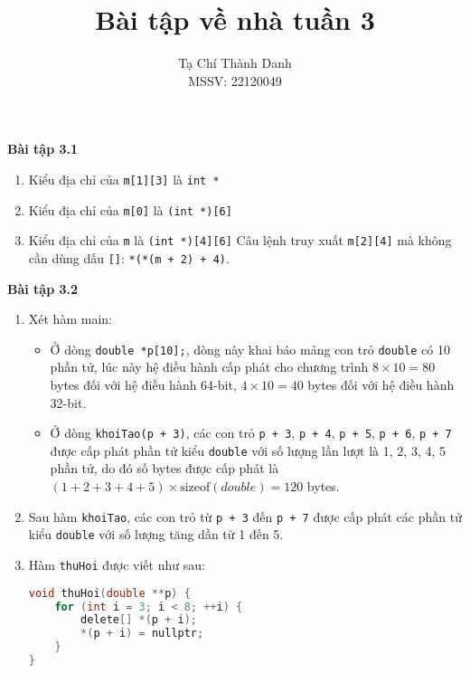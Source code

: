 \documentclass[a4paper, 12pt, notitlepage]{article}
\title{Bài tập về nhà tuần 3}
\author{Tạ Chí Thành Danh \\ MSSV: 22120049}
\begin{document}
  \maketitle
    \phantom{a}\newline
    \textbf{Bài tập 3.1}\\
    \begin{enumerate}[label=(\alph*)]
      \item Kiểu địa chỉ của \verb|m[1][3]| là \verb|int *|
      \item Kiểu địa chỉ của \verb|m[0]| là \verb|(int *)[6]|
      \item Kiểu địa chỉ của \verb|m| là \verb|(int *)[4][6]|
      Câu lệnh truy xuất \verb|m[2][4]| mà không cần dùng dấu \verb|[]|: \verb|*(*(m + 2) + 4)|.  
    \end{enumerate}
    \textbf{Bài tập 3.2}\\
    \begin{enumerate}[label=(\alph*)]
      \item Xét hàm main:
      \begin{itemize}
        \item Ở dòng \verb|double *p[10];|, dòng này khai báo mảng con trỏ \verb|double| có 10 phần tử, lúc này hệ điều hành cấp phát cho chương trình \(8 \times 10 = 80\) bytes đối với hệ điều hành 64-bit, \(4 \times 10 = 40\) bytes đối với hệ điều hành 32-bit.
        \item Ở dòng \verb|khoiTao(p + 3)|, các con trỏ \verb|p + 3|, \verb|p + 4|, \verb|p + 5|, \verb|p + 6|, \verb|p + 7| được cấp phát phần tử kiểu \verb|double| với số lượng lần lượt là 1, 2, 3, 4, 5 phần tử, do đó số bytes được cấp phát là \(\left(1 + 2 + 3 + 4 + 5\right) \times \textrm{sizeof}(double) = 120\) bytes. 
      \end{itemize}
      \item Sau hàm \verb|khoiTao|, các con trỏ từ \verb|p + 3| đến \verb|p + 7| được cấp phát các phần tử kiểu \verb|double| với số lượng tăng dần từ 1 đến 5.
      \item Hàm \verb|thuHoi| được viết như sau:
\begin{lstlisting}[language=C]
void thuHoi(double **p) {
    for (int i = 3; i < 8; ++i) {
        delete[] *(p + i);
        *(p + i) = nullptr;
    }
}
\end{lstlisting}
    \end{enumerate}
\end{document}
